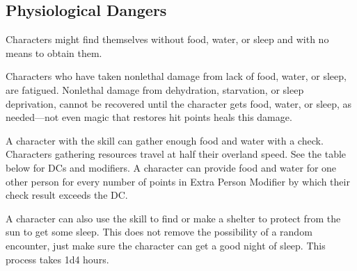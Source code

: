 \subsection{Physiological Dangers}
Characters might find themselves without food, water, or sleep and with no means to obtain them.

Characters who have taken nonlethal damage from lack of food, water, or sleep, are fatigued. Nonlethal damage from dehydration, starvation, or sleep deprivation, cannot be recovered until the character gets food, water, or sleep, as needed---not even magic that restores hit points heals this damage.

A character with the  skill can gather enough food and water with a check. Characters gathering resources travel at half their overland speed. See the table below for DCs and modifiers. A character can provide food and water for one other person for every number of points in Extra Person Modifier by which their check result exceeds the DC.


A character can also use the  skill to find or make a shelter to protect from the sun to get some sleep. This does not remove the possibility of a random encounter, just make sure the character can get a good night of sleep. This process takes 1d4 hours.



